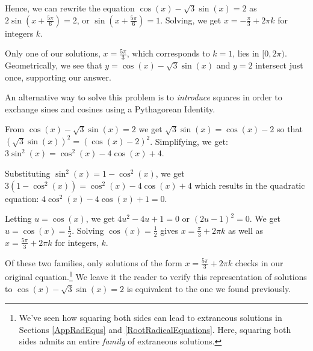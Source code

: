 \documentclass{ximera}
\begin{document}
\begin{example}
\begin{explanation}
\begin{enumerate}
  
 
 Hence, we can rewrite the equation  $\cos(x) - \sqrt{3} \sin(x) = 2$  as $2 \sin\left(x + \frac{5\pi}{6}\right) = 2$, or $\sin\left(x + \frac{5\pi}{6}\right) = 1$.   Solving, we get $x  = - \frac{\pi}{3} + 2\pi k$ for integers $k$.
 
  
 
Only one of our solutions, $x = \frac{5\pi}{3}$, which corresponds to $k=1$, lies in $[0,2\pi)$.  Geometrically, we see that $y = \cos(x) - \sqrt{3} \sin(x)$ and $y = 2$ intersect just once, supporting our answer.

\begin{center}
\end{center}

An alternative way to solve this problem is to \textit{introduce} squares in order to exchange sines and cosines using a Pythagorean Identity. 

 

 From  $\cos(x) - \sqrt{3} \sin(x) = 2$ we get $\sqrt{3} \sin(x) = \cos(x) - 2$ so that $\left(\sqrt{3} \sin(x)\right)^2 = \left(\cos(x) - 2\right)^2$.  Simplifying, we get: $3 \sin^{2}(x) = \cos^{2}(x) - 4 \cos(x) + 4$.
 
  
 
 Substituting $\sin^{2}(x) = 1 - \cos^{2}(x)$, we get $3(1 - \cos^{2}(x)) = \cos^{2}(x) - 4\cos(x) + 4$ which results in the quadratic equation: $4 \cos^{2}(x) - 4 \cos(x) +1 = 0$.  
 
  
 
 Letting $u = \cos(x)$, we get $4u^2 - 4u + 1 = 0$ or $(2u - 1)^2 = 0$.  We get $u = \cos(x) = \frac{1}{2}$.  Solving $\cos(x) = \frac{1}{2}$ gives $x = \frac{\pi}{3} + 2\pi k$ as well as $x = \frac{5\pi}{3} + 2\pi k$ for integers, $k$.  
 
  
 
 Of these two families, only  solutions of the form $x = \frac{5\pi}{3} + 2\pi k$ checks in our original equation.\footnote{We've seen how squaring both sides can lead to extraneous solutions in Sections \ref{AppRadEqus} and \ref{RootRadicalEquations}. Here, squaring both sides admits an entire \textit{family} of extraneous solutions.}  We leave it the reader to verify this representation of solutions to $\cos(x) - \sqrt{3} \sin(x) = 2$ is equivalent to the one we found previously. 

\end{enumerate}
\end{explanation}

\end{example}
 
\end{document}
